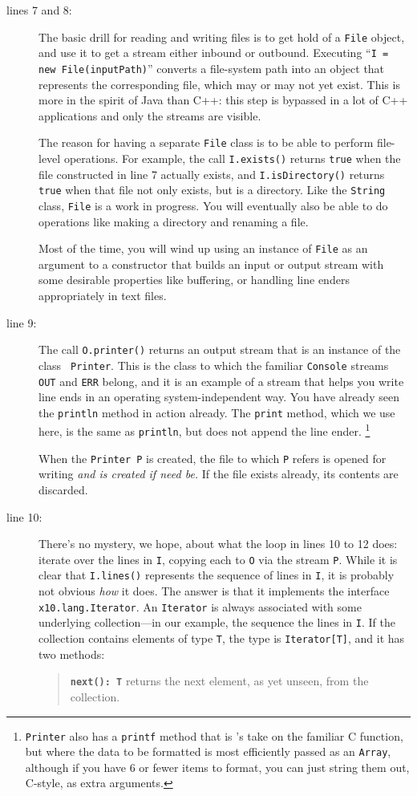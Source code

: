 \begin{description}
\item[lines 7 and 8:] 
The basic drill for reading and writing files is to get hold of a {\tt File}
object, and use it to get a stream either inbound or outbound. 
Executing ``{\tt I = new File(in\-put\-Path)}'' converts
a file-system path into an object that represents
the corresponding file, which may or may not yet exist.
This is more in the
spirit of Java than C++:
this step is bypassed in a lot of C++ applications and only the streams are visible.

The reason for having a separate {\tt File} class
is to be able to perform file-level operations.  For example, the call
{\tt I.exists()}  returns {\tt true} when the file constructed in line 7 actually exists,
and {\tt I.isDirectory()} returns {\tt true} when that file not only exists, but is a
directory.  Like the {\tt String} class, {\tt File} is a work in progress.
You will eventually also be able to do operations like making a directory and
renaming a file.  

Most of the time, you will wind up using an instance of {\tt File} as an argument
to a constructor that builds an input or output stream with some desirable
properties like buffering, or handling line enders appropriately in text files.

\item[line 9:] The call {\tt O.printer()} returns an output stream that is an
instance of the class {\tt
Printer}.  This is the class to which the familiar {\tt Console} streams {\tt
OUT} and {\tt ERR} belong, and it is an example of a stream that helps you
write line ends in an operating system-independent way.  
You have already seen the {\tt println} method in action
already.  The {\tt print} method, which we use
here, is the same as {\tt println}, but does not append
the line ender. 
\footnote{ {\tt Printer} also has a {\tt printf} method that is \Xten's take on
the familiar C function, but where the data to be formatted is most
efficiently passed as an {\tt Array}, although if you have 6 or fewer items
to format, you can just string them out, C-style, as extra arguments.}

When the {\tt Printer P} is created, the file to which {\tt P} refers is opened for
writing {\em and is created if need be.}  If the file exists already, its contents are
discarded.
\item[line 10:]  There's no mystery, we hope, about what the loop in lines 10 to
12 does: iterate over the lines in {\tt I}, copying each to {\tt O} via the stream
{\tt P}.  While it is clear that {\tt I.lines()} represents the sequence of lines in
{\tt I}, it is probably not obvious {\em how} it does.  The answer is that it 
implements the interface {\tt x10.lang.Iterator}.
An {\tt Iterator} is always associated with
some underlying collection---in our example, the sequence the lines in {\tt I}.
If the collection contains elements of type {\tt T}, 
the type is {\tt Iterator[T]}, and it has two methods:
\begin{quote}
{\tt {\bf next(): T}} returns the next element, as yet unseen, from the
collection. 


\end{quote}
\end{description}

